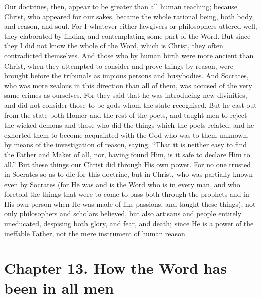 \documentclass[9pt, twocolumn, oneside, a4paper]{memoir}
\begin{document}
Our doctrines, then, appear to be greater than all human teaching; because Christ, who appeared for our sakes, became the whole rational being, both body, and reason, and soul. For I whatever either lawgivers or philosophers uttered well, they elaborated by finding and contemplating some part of the Word. But since they I did not know the whole of the Word, which is Christ, they often contradicted themselves. And those who by human birth were more ancient than Christ, when they attempted to consider and prove things by reason, were brought before the tribunals as impious persons and busybodies. And Socrates, who was more zealous in this direction than all of them, was accused of the very same crimes as ourselves. For they said that he was introducing new divinities, and did not consider those to be gods whom the state recognised. But he cast out from the state both Homer  and the rest of the poets, and taught men to reject the wicked demons and those who did the things which the poets related; and he exhorted them to become acquainted with the God who was to them unknown, by means of the investigation of reason, saying, ``That it is neither easy to find the Father and Maker of all, nor, having found Him, is it safe to declare Him to all.''  But these things our Christ did through His own power. For no one trusted in Socrates so as to die for this doctrine, but in Christ, who was partially known even by Socrates (for He was and is the Word who is in every man, and who foretold the things that were to come to pass both through the prophets and in His own person when He was made of like passions, and taught these things), not only philosophers and scholars believed, but also artisans and people entirely uneducated, despising both glory, and fear, and  death; since He is a power of the ineffable Father, not the mere instrument of human reason. 
\section*{Chapter 13. How the Word has been in all men}
\end{document}
